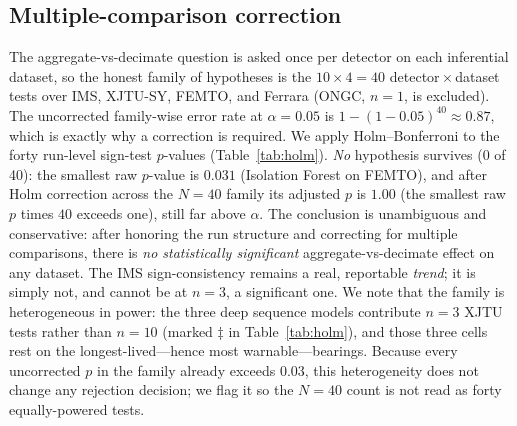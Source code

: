\documentclass[journal]{IEEEtran}
\begin{document}
\subsection{Multiple-comparison correction}
\label{sec:holm}
The aggregate-vs-decimate question is asked once per detector on each
inferential dataset, so the honest family of hypotheses is the
$10\times4=40$ detector\,$\times$\,dataset tests over IMS, XJTU-SY, FEMTO, and
Ferrara (ONGC, $n{=}1$, is excluded). The uncorrected family-wise error rate at
$\alpha{=}0.05$ is $1-(1-0.05)^{40}\approx0.87$, which is exactly why a
correction is required.
We apply Holm--Bonferroni to the forty run-level sign-test $p$-values
(Table~\ref{tab:holm}). \emph{No} hypothesis survives (0 of 40): the smallest raw
$p$-value is $0.031$ (Isolation Forest on FEMTO), and after Holm correction
across the $N{=}40$ family its adjusted $p$ is $1.00$ (the smallest raw $p$ times
$40$ exceeds one), still far above $\alpha$. The
conclusion is unambiguous
and conservative: after honoring the run structure and correcting for multiple
comparisons, there is \emph{no statistically significant} aggregate-vs-decimate
effect on any dataset. The IMS sign-consistency remains a real, reportable
\emph{trend}; it is simply not, and cannot be at $n{=}3$, a significant one.
We note that the family is heterogeneous in power: the three deep sequence models
contribute $n{=}3$ XJTU tests rather than $n{=}10$ (marked $\ddagger$ in
Table~\ref{tab:holm}), and those three cells rest on the longest-lived---hence
most warnable---bearings. Because every uncorrected $p$ in the family already
exceeds $0.03$, this heterogeneity does not change any rejection decision; we flag
it so the $N{=}40$ count is not read as forty equally-powered tests.
\end{document}
